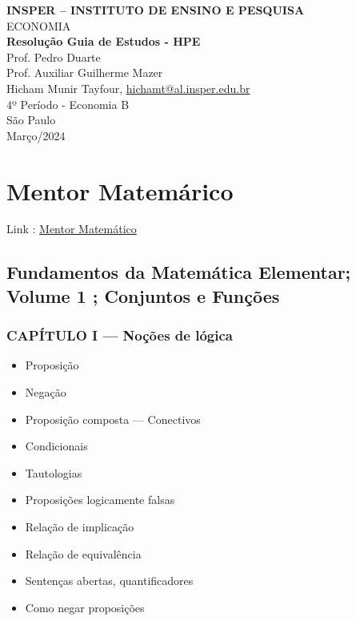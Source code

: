\documentclass[a4paper,12pt]{article}[abntex2]
\begin{document}
\begin{titlepage}
    \centering
    \vspace*{1cm}
    \Large\textbf{INSPER – INSTITUTO DE ENSINO E PESQUISA}\\
    \Large ECONOMIA\\
    \vspace{1.5cm}
    \Large\textbf{Resolução Guia de Estudos - HPE}\\
    \vspace{1.5cm}
    Prof. Pedro Duarte\\
    Prof. Auxiliar Guilherme Mazer\\
    \vfill
    \normalsize
    Hicham Munir Tayfour, \href{mailto:hichamt@al.insper.edu.br}{hichamt@al.insper.edu.br}\\
    4º Período - Economia B\\
    \vfill
    São Paulo\\
    Março/2024
\end{titlepage}

\newpage
\tableofcontents
\thispagestyle{empty} %
\newpage
\setcounter{page}{1} %
\justify
\onehalfspacing

\pagestyle{fancy}
\fancyhf{}
\rhead{\thepage}

\section{\textbf{Mentor Matemárico}}
Link : \href{https://chatgpt.com/g/g-85ZEueC6o-mentor-matematico}{Mentor Matemático}

\subsection{Fundamentos da Matemática Elementar; Volume 1 ; Conjuntos e Funções}
\subsubsection*{CAPÍTULO I — Noções de lógica}

\begin{itemize}
\item Proposição
\item Negação
\item Proposição composta — Conectivos
\item Condicionais
\item Tautologias
\item Proposições logicamente falsas
\item Relação de implicação
\item Relação de equivalência
\item Sentenças abertas, quantificadores
\item Como negar proposições
\end{itemize}
\end{document}
